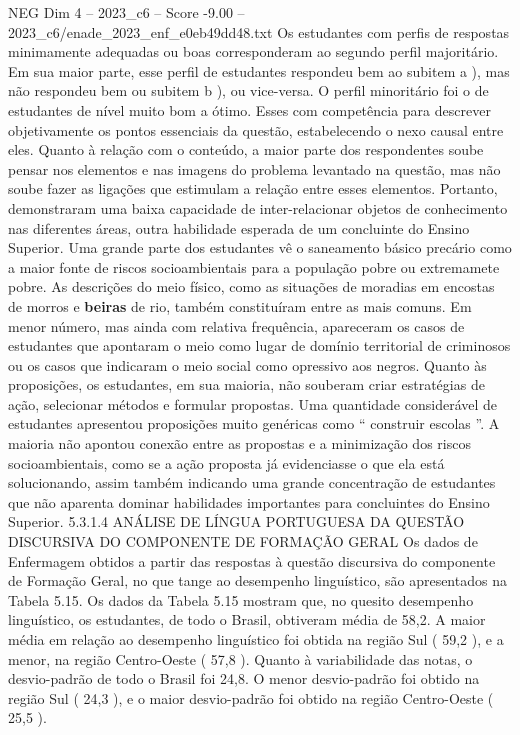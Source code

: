 \begin{textsample}{NEG Dim 4 – 2023\_c6 – Score -9.00 – 2023\_c6/enade\_2023\_enf\_e0eb49dd48.txt}
Os estudantes com perfis de respostas minimamente adequadas ou boas corresponderam ao segundo perfil majoritário.
Em sua maior parte, esse perfil de estudantes respondeu bem ao subitem a ), mas não respondeu bem ou subitem b ), ou vice-versa.
O perfil minoritário foi o de estudantes de nível muito bom a ótimo.
Esses com competência para descrever objetivamente os pontos essenciais da questão, estabelecendo o nexo causal entre eles.
Quanto à relação com o conteúdo, a maior parte dos respondentes soube pensar nos elementos e nas imagens do problema levantado na questão, mas não soube fazer as ligações que estimulam a relação entre esses elementos.
Portanto, demonstraram uma baixa capacidade de inter-relacionar objetos de conhecimento nas diferentes áreas, outra habilidade esperada de um concluinte do Ensino Superior.
Uma grande parte dos estudantes vê o saneamento básico precário como a maior fonte de riscos socioambientais para a população pobre ou extremamete pobre.
As descrições do meio físico, como as situações de moradias em encostas de morros e \textbf{beiras} de rio, também constituíram entre as mais comuns.
Em menor número, mas ainda com relativa frequência, apareceram os casos de estudantes que apontaram o meio como lugar de domínio territorial de criminosos ou os casos que indicaram o meio social como opressivo aos negros.
Quanto às proposições, os estudantes, em sua maioria, não souberam criar estratégias de ação, selecionar métodos e formular propostas.
Uma quantidade considerável de estudantes apresentou proposições muito genéricas como “ construir escolas ”.
A maioria não apontou conexão entre as propostas e a minimização dos riscos socioambientais, como se a ação proposta já evidenciasse o que ela está solucionando, assim também indicando uma grande concentração de estudantes que não aparenta dominar habilidades importantes para concluintes do Ensino Superior. 5.3.1.4 ANÁLISE DE LÍNGUA PORTUGUESA DA QUESTÃO DISCURSIVA DO COMPONENTE DE FORMAÇÃO GERAL Os dados de Enfermagem obtidos a partir das respostas à questão discursiva do componente de Formação Geral, no que tange ao desempenho linguístico, são apresentados na Tabela 5.15.
Os dados da Tabela 5.15 mostram que, no quesito desempenho linguístico, os estudantes, de todo o Brasil, obtiveram média de 58,2.
A maior média em relação ao desempenho linguístico foi obtida na região Sul ( 59,2 ), e a menor, na região Centro-Oeste ( 57,8 ).
Quanto à variabilidade das notas, o desvio-padrão de todo o Brasil foi 24,8.
O menor desvio-padrão foi obtido na região Sul ( 24,3 ), e o maior desvio-padrão foi obtido na região Centro-Oeste ( 25,5 ).

\end{textsample}
